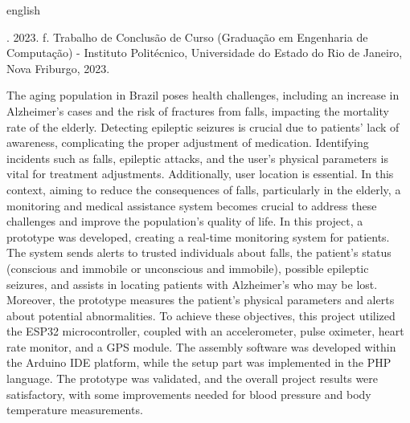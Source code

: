 
\begin{resumo}[Abstract]
\begin{otherlanguage*}{english}
\begin{SingleSpace}

\noindent
\begin{flushleft}
\entradaAutor{}. \textit{\englishTitle{}} 2023.\pageref{LastPage} f. Trabalho de Conclusão de Curso (Graduação em Engenharia de Computação) - Instituto Politécnico, Universidade do Estado do Rio de Janeiro, Nova Friburgo, 2023.
\end{flushleft}
\vspace{\onelineskip}

\setlength{\parindent}{1.3cm}

The aging population in Brazil poses health challenges, including an increase in Alzheimer's cases and the risk of fractures from falls, impacting the mortality rate of the elderly. Detecting epileptic seizures is crucial due to patients' lack of awareness, complicating the proper adjustment of medication. Identifying incidents such as falls, epileptic attacks, and the user's physical parameters is vital for treatment adjustments. Additionally, user location is essential. In this context, aiming to reduce the consequences of falls, particularly in the elderly, a monitoring and medical assistance system becomes crucial to address these challenges and improve the population's quality of life. In this project, a prototype was developed, creating a real-time monitoring system for patients. The system sends alerts to trusted individuals about falls, the patient's status (conscious and immobile or unconscious and immobile), possible epileptic seizures, and assists in locating patients with Alzheimer's who may be lost. Moreover, the prototype measures the patient's physical parameters and alerts about potential abnormalities. To achieve these objectives, this project utilized the ESP32 microcontroller, coupled with an accelerometer, pulse oximeter, heart rate monitor, and a GPS module. The assembly software was developed within the Arduino IDE platform, while the setup part was implemented in the PHP language. The prototype was validated, and the overall project results were satisfactory, with some improvements needed for blood pressure and body temperature measurements.


\end{SingleSpace}
\end{otherlanguage*}
\end{resumo}
